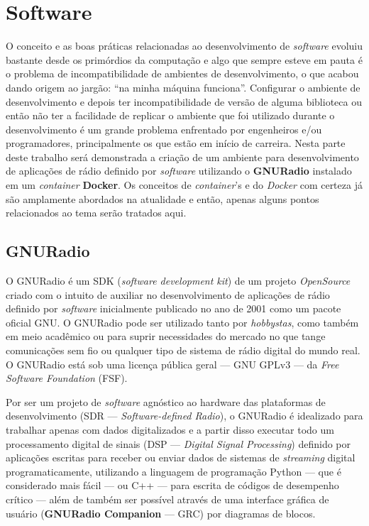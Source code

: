 \documentclass[
  12pt,				%
  openright,			%
  twoside,			%
  a4paper,			%
  english,			%
  french,				%
  spanish,			%
  brazil,				%
  ]{abntex2}
\begin{document}
\chapter{Software}

O conceito e as boas práticas relacionadas ao desenvolvimento de \textit{software} evoluiu bastante desde os primórdios da computação e algo que sempre esteve
em pauta é o problema de incompatibilidade de ambientes de desenvolvimento, o que acabou dando origem ao jargão: “na minha máquina funciona”.
Configurar o ambiente de desenvolvimento e depois ter incompatibilidade de versão de alguma biblioteca ou então não ter a facilidade de replicar o ambiente
que foi utilizado durante o desenvolvimento é um grande problema enfrentado por engenheiros e/ou programadores, principalmente os que estão em início de carreira.
Nesta parte deste trabalho será demonstrada a criação de um ambiente para desenvolvimento de aplicações de rádio definido por \textit{software} utilizando
o \textbf{GNURadio} instalado em um \textit{container} \textbf{Docker}.
Os conceitos de \textit{container}'s e do \textit{Docker} com certeza já são amplamente abordados na atualidade e então, apenas alguns pontos relacionados ao tema
serão tratados aqui.

\section*{GNURadio}

O GNURadio é um SDK (\textit{software development kit}) de um projeto \textit{OpenSource} criado com o intuito de auxiliar no desenvolvimento de aplicações de
rádio definido por \textit{software} inicialmente publicado no ano de 2001 como um pacote oficial GNU.
O GNURadio pode ser utilizado tanto por \textit{hobbystas}, como também em meio acadêmico ou para suprir necessidades do mercado no que tange comunicações sem
fio ou qualquer tipo de sistema de rádio digital do mundo real.
O GNURadio está sob uma licença pública geral — GNU GPLv3 — da \textit{Free Software Foundation} (FSF).

Por ser um projeto de \textit{software} agnóstico ao hardware das plataformas de desenvolvimento (SDR — \textit{Software-defined Radio}), o GNURadio é idealizado
para trabalhar apenas com dados digitalizados e a partir disso executar todo um processamento digital de sinais (DSP — \textit{Digital Signal Processing})
definido por aplicações escritas para receber ou enviar dados de sistemas de \textit{streaming} digital programaticamente, utilizando a linguagem de programação
Python — que é considerado mais fácil — ou C++ — para escrita de códigos de desempenho crítico — além de também ser possível através de uma interface gráfica de
usuário (\textbf{GNURadio Companion} — GRC) por diagramas de blocos.
\end{document}
